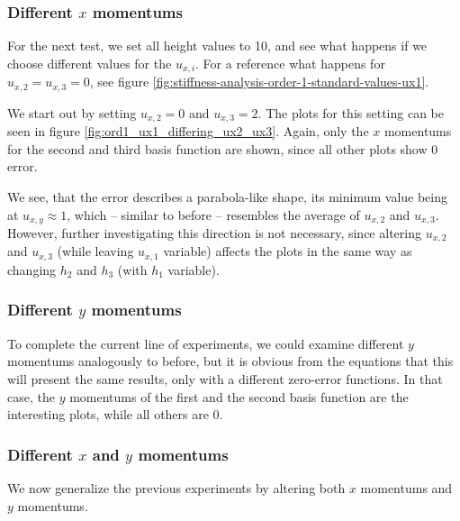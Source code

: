 \documentclass[a4paper, twoside]{article}
\begin{document}
\subsubsection{\texorpdfstring{Different $x$ momentums}{Different x momentums}}
\label{sec:stiffness-analysis-ord1-nonstandard-diff-ux}

For the next test, we set all height values to 10, and see what happens if we choose different values for the $u_{x,i}$. For a reference what happens for $u_{x,2}=u_{x,3}=0$, see figure \ref{fig:stiffness-analysis-order-1-standard-values-ux1}.

We start out by setting $u_{x,2}=0$ and $u_{x,3}=2$. The plots for this setting can be seen in figure \ref{fig:ord1_ux1_differing_ux2_ux3}. Again, only the $x$ momentums for the second and third basis function are shown, since all other plots show 0 error.



We see, that the error describes a parabola-like shape, its minimum value being at $u_{x,y}\approx 1$, which -- similar to before -- resembles the average of $u_{x,2}$ and $u_{x,3}$. However, further investigating this direction is not necessary, since altering $u_{x,2}$ and $u_{x,3}$ (while leaving $u_{x,1}$ variable) affects the plots in the same way as changing $h_2$ and $h_3$ (with $h_1$ variable).

\subsubsection{\texorpdfstring{Different $y$ momentums}{Different y momentums}}
\label{sec:stiffness-analysis-ord1-nonstandard-diff-uy}

To complete the current line of experiments, we could examine different $y$ momentums analogously to before, but it is obvious from the equations that this will present the same results, only with a different zero-error functions. In that case, the $y$ momentums of the first and the second basis function are the interesting plots, while all others are 0.

\subsubsection{\texorpdfstring{Different $x$ and $y$ momentums}{Different x and y momentums}}
\label{sec:stiffness-analysis-different-ux-uy-momentums}

We now generalize the previous experiments by altering both $x$ momentums and $y$ momentums.
\end{document}
